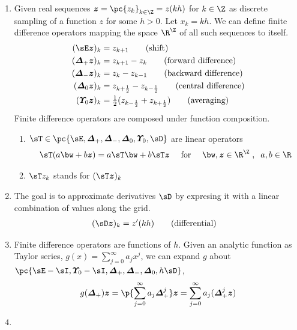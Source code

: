 \documentclass[11pt]{article}
\begin{document}
\begin{enumerate}
    \item {} Given real sequences $\bz = \pc{z_k}_{k\in\Z} = z(kh)$ for $k\in\Z$ as discrete sampling of a function $z$ for some $h>0$. Let $x_k = kh$. We can define finite difference operators mapping the space $\R^{\Z}$ of all such sequences to itself.
    \begin{align*}
        (\shift \bz)_k 
            &= z_{k+1} \tag{shift} \\
        (\forw \bz)_k  
            &= z_{k+1} - z_k \tag{forward difference} \\
        (\back \bz)_k 
            &= z_k - z_{k-1} \tag{backward difference} \\
        (\cent \bz)_k 
            &= z_{k+\frac{1}{2}} - z_{k - \frac{1}{2}} \tag{central difference} \\
        (\avg \bz)_k 
            &= \textstyle\frac{1}{2} (z_{k-\frac{1}{2}} + z_{k+\frac{1}{2}}) \tag{averaging}
    \end{align*}
    Finite difference operators are composed under function composition.
    \begin{enumerate}
        \item {} $\sT \in \pc{\shift, \forw, \back, \cent, \avg, \diff}$ are linear operators
        \[
            \sT(a\bw + b\bz) = a\sT\bw + b\sT\bz
            \quad \text{ for } \quad
            \bw,\bz\in\R^{\Z}\;,\;\; a,b\in\R    
        \]
        \item {} $\sT z_k$ stands for $(\sT \bz)_k$
    \end{enumerate} 
    \item {} The goal is to approximate derivatives $\diff$ by expresing it with a linear combination of values along the grid.
    \begin{align*}
        (\diff\bz)_k &= z'(kh) \tag{differential}
    \end{align*}
    \item {} Finite difference operators are functions of $h$. Given an analytic function as Taylor series, $g(x) = \textstyle\sum_{j=0}^{\infty} a_j x^j$, we can expand $g$ about $\pc{\shift-\id, \avg - \id, \forw, \back, \cent, h\diff}$,
    \[
        g(\forw)\bz = \p{
            \sum_{j=0}^{\infty} a_j \forw^j
        } \bz = 
        \sum_{j=0}^{\infty} a_j (\forw^j \bz)
    \]
    \item {}

\end{enumerate}
\end{document}
